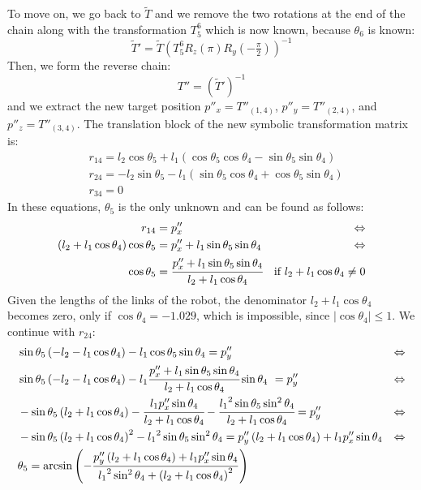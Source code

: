 To move on, we go back to $\widetilde{T}$ and we remove the two rotations at the end of the chain along with the transformation $T^6_5$ which is now known, because $\theta_6$ is known:
\[
\widetilde{T}' = \widetilde{T}\left(T^6_5R_z\left(\pi\right)R_y(-\tfrac{\pi}{2})\right)^{-1}
\]
Then, we form the reverse chain: 
\[
T'' = \left( \widetilde{T}' \right) ^{-1}
\]
and we extract the new target position $p''_x = T''_{(1,4)}$, $p''_y = T''_{(2,4)}$, and $p''_z = T''_{(3,4)}$. The translation block of the new symbolic transformation matrix is:
\begin{align*}
&r_{14} = l_2\cos\theta_5 + l_1\left(\cos\theta_5\cos\theta_4 - \sin\theta_5\sin\theta_4\right)\\
&r_{24} = -l_2\sin\theta_5 - l_1\left(\sin\theta_5\cos\theta_4 + \cos\theta_5\sin\theta_4\right)\\
&r_{34} = 0
\end{align*}
In these equations, $\theta_5$ is the only unknown and can be found as follows:
\begin{align*}
r_{14} &= p''_x & \Leftrightarrow\\
\left(l_2+l_1\cos\theta_4\right) \cos\theta_5 &= p''_x + l_1\sin\theta_5\sin\theta_4 & \Leftrightarrow\\
\cos\theta_5 &= \cfrac{p''_x + l_1\sin\theta_5\sin\theta_4}{l_2+l_1\cos\theta_4}&\text{if }l_2+l_1\cos\theta_4\neq0\\
\end{align*}
Given the lengths of the links of the robot, the denominator $l_2+l_1\cos\theta_4$ becomes zero, only if $\cos\theta_4 = -1.029$, which is impossible, since $|\cos\theta_4| \le 1$. We continue with $r_{24}$: 
\begin{align*}
&\sin\theta_5\left(-l_2-l_1\cos\theta_4\right) - l_1\cos\theta_5\sin\theta_4 = p''_y& \Leftrightarrow\\
&\sin\theta_5\left(-l_2-l_1\cos\theta_4\right) - l_1\cfrac{p''_x + l_1\sin\theta_5\sin\theta_4}{l_2+l_1\cos\theta_4}\sin\theta_4\ =p''_y & \Leftrightarrow\\
&-\sin\theta_5\left(l_2+l_1\cos\theta_4\right) - \cfrac{l_1p''_x\sin\theta_4}{l_2+l_1\cos\theta_4} - \cfrac{{l_1}^2\sin\theta_5\sin^2\theta_4}{l_2+l_1\cos\theta_4} = p''_y&\Leftrightarrow\\
&-\sin\theta_5\left(l_2+l_1\cos\theta_4\right)^2 - {l_1}^2\sin\theta_5\sin^2\theta_4 = p''_y\left(l_2+l_1\cos\theta_4\right) + l_1p''_x\sin\theta_4 & \Leftrightarrow\\
&\theta_5 = \arcsin\left(-\frac{p''_y\left(l_2+l_1\cos\theta_4\right) + l_1p''_x\sin\theta_4}{{l_1}^2\sin^2\theta_4 + \left(l_2 + l_1\cos\theta_4\right)^2}\right)
\end{align*}
